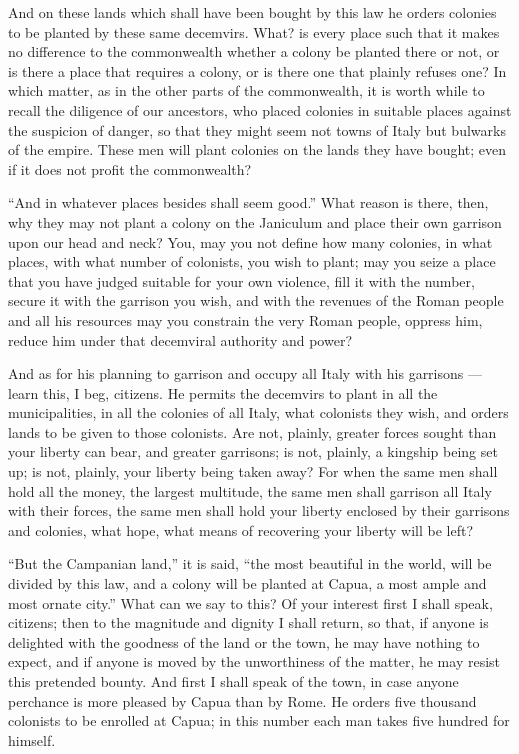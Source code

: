 And on these lands which shall have been bought by this law he orders colonies to be planted by these same decemvirs. What? is every place such that it makes no difference to the commonwealth whether a colony be planted there or not, or is there a place that requires a colony, or is there one that plainly refuses one? In which matter, as in the other parts of the commonwealth, it is worth while to recall the diligence of our ancestors, who placed colonies in suitable places against the suspicion of danger, so that they might seem not towns of Italy but bulwarks of the empire. These men will plant colonies on the lands they have bought; even if it does not profit the commonwealth?

 ``And in whatever places besides shall seem good.'' What reason is there, then, why they may not plant a colony on the Janiculum and place their own garrison upon our head and neck? You, may you not define how many colonies, in what places, with what number of colonists, you wish to plant; may you seize a place that you have judged suitable for your own violence, fill it with the number, secure it with the garrison you wish, and with the revenues of the Roman people and all his resources may you constrain the very Roman people, oppress him, reduce him under that decemviral authority and power?

 And as for his planning to garrison and occupy all Italy with his garrisons --- learn this, I beg, citizens. He permits the decemvirs to plant in all the municipalities, in all the colonies of all Italy, what colonists they wish, and orders lands to be given to those colonists. Are not, plainly, greater forces sought than your liberty can bear, and greater garrisons; is not, plainly, a kingship being set up; is not, plainly, your liberty being taken away? For when the same men shall hold all the money, the largest multitude, the same men shall garrison all Italy with their forces, the same men shall hold your liberty enclosed by their garrisons and colonies, what hope, what means of recovering your liberty will be left?

 ``But the Campanian land,'' it is said, ``the most beautiful in the world, will be divided by this law, and a colony will be planted at Capua, a most ample and most ornate city.'' What can we say to this? Of your interest first I shall speak, citizens; then to the magnitude and dignity I shall return, so that, if anyone is delighted with the goodness of the land or the town, he may have nothing to expect, and if anyone is moved by the unworthiness of the matter, he may resist this pretended bounty. And first I shall speak of the town, in case anyone perchance is more pleased by Capua than by Rome. He orders five thousand colonists to be enrolled at Capua; in this number each man takes five hundred for himself.

